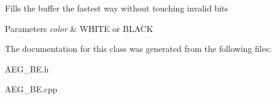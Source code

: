 Fills the buffer the fastest way without touching invalid bits 
\begin{DoxyParams}{Parameters}
{\em color} & W\+H\+I\+TE or B\+L\+A\+CK \\
\hline
\end{DoxyParams}


The documentation for this class was generated from the following files\+:\begin{DoxyCompactItemize}
\item 
A\+E\+G\+\_\+\+B\+E.\+h\item 
A\+E\+G\+\_\+\+B\+E.\+cpp\end{DoxyCompactItemize}
